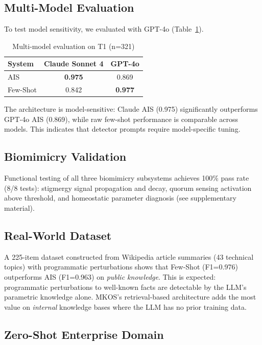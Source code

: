 \documentclass[11pt]{article}
\begin{document}
\subsection{Multi-Model Evaluation}

To test model sensitivity, we evaluated with GPT-4o (Table~\ref{tab:multimodel}).

\begin{table}[h]
\centering
\caption{Multi-model evaluation on T1 (n=321)}
\label{tab:multimodel}
\begin{tabular}{lcc}
\toprule
\textbf{System} & \textbf{Claude Sonnet 4} & \textbf{GPT-4o} \\
\midrule
AIS & \textbf{0.975} & 0.869 \\
Few-Shot & 0.842 & \textbf{0.977} \\
\bottomrule
\end{tabular}
\end{table}

The architecture is model-sensitive: Claude AIS (0.975) significantly outperforms GPT-4o AIS (0.869), while raw few-shot performance is comparable across models. This indicates that detector prompts require model-specific tuning.

\subsection{Biomimicry Validation}

Functional testing of all three biomimicry subsystems achieves 100\% pass rate (8/8 tests): stigmergy signal propagation and decay, quorum sensing activation above threshold, and homeostatic parameter diagnosis (see supplementary material).

\subsection{Real-World Dataset}

A 225-item dataset constructed from Wikipedia article summaries (43 technical topics) with programmatic perturbations shows that Few-Shot (F1=0.976) outperforms AIS (F1=0.963) on \emph{public knowledge}. This is expected: programmatic perturbations to well-known facts are detectable by the LLM's parametric knowledge alone. MKOS's retrieval-based architecture adds the most value on \emph{internal} knowledge bases where the LLM has no prior training data.

\subsection{Zero-Shot Enterprise Domain}
\label{sec:zero-shot}
\end{document}
